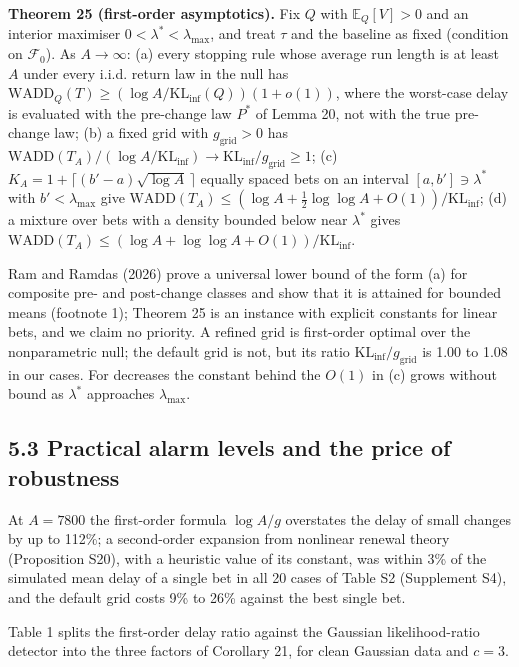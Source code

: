 \documentclass[
]{article}
\begin{document}
\textbf{Theorem 25 (first-order asymptotics).} Fix \(Q\) with
\(\mathbb{E}_Q[V] > 0\) and an interior maximiser
\(0 < \lambda^\ast < \lambda_{\max}\), and treat \(\tau\) and the
baseline as fixed (condition on \(\mathcal{F}_0\)). As \(A \to \infty\):
(a) every stopping rule whose average run length is at least \(A\) under
every i.i.d. return law in the null has
\(\mathrm{WADD}_Q(T) \ge (\log A/\mathrm{KL}_{\inf}(Q))(1 + o(1))\),
where the worst-case delay is evaluated with the pre-change law
\(P^\ast\) of Lemma 20, not with the true pre-change law; (b) a fixed
grid with \(g_{\mathrm{grid}} > 0\) has
\(\mathrm{WADD}(T_A)/(\log A/\mathrm{KL}_{\inf}) \to \mathrm{KL}_{\inf}/g_{\mathrm{grid}} \ge 1\);
(c) \(K_A = 1 + \lceil (b' - a)\sqrt{\log A}\,\rceil\) equally spaced
bets on an interval \([a, b'] \ni \lambda^\ast\) with
\(b' < \lambda_{\max}\) give
\(\mathrm{WADD}(T_A) \le (\log A + \tfrac12 \log\log A + O(1))/\mathrm{KL}_{\inf}\);
(d) a mixture over bets with a density bounded below near
\(\lambda^\ast\) gives
\(\mathrm{WADD}(T_A) \le (\log A + \log\log A + O(1))/\mathrm{KL}_{\inf}\).

Ram and Ramdas (2026) prove a universal lower bound of the form (a) for
composite pre- and post-change classes and show that it is attained for
bounded means (footnote 1); Theorem 25 is an instance with explicit
constants for linear bets, and we claim no priority. A refined grid is
first-order optimal over the nonparametric null; the default grid is
not, but its ratio \(\mathrm{KL}_{\inf}/g_{\mathrm{grid}}\) is 1.00 to
1.08 in our cases. For decreases the constant behind the \(O(1)\) in (c)
grows without bound as \(\lambda^\ast\) approaches \(\lambda_{\max}\).

\hypertarget{practical-alarm-levels-and-the-price-of-robustness}{%
\subsection{5.3 Practical alarm levels and the price of
robustness}\label{practical-alarm-levels-and-the-price-of-robustness}}

At \(A = 7800\) the first-order formula \(\log A/g\) overstates the
delay of small changes by up to 112\%; a second-order expansion from
nonlinear renewal theory (Proposition S20), with a heuristic value of
its constant, was within 3\% of the simulated mean delay of a single bet
in all 20 cases of Table S2 (Supplement S4), and the default grid costs
9\% to 26\% against the best single bet.

Table 1 splits the first-order delay ratio against the Gaussian
likelihood-ratio detector into the three factors of Corollary 21, for
clean Gaussian data and \(c = 3\).
\end{document}
